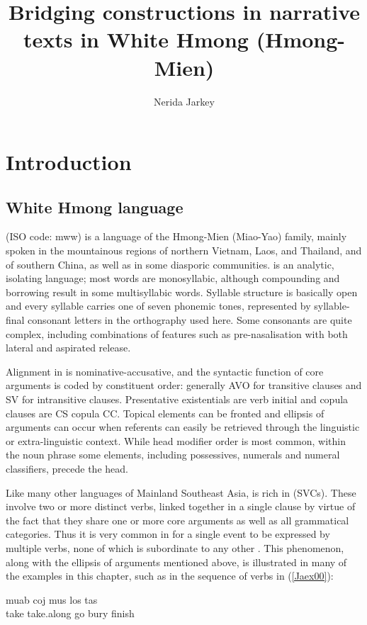 \documentclass[output=paper]{LSP/langsci}
\author{
   Nerida Jarkey\affiliation{School of {L}anguages and {C}ultures, University of Sydney}
}
\title{Bridging constructions in narrative texts in White Hmong (Hmong-Mien)}
\begin{document}
\section{Introduction} 
\label{Jasec:Introduction}

\subsection{White Hmong language}
 (ISO code: mww) is a language of the Hmong-Mien (Miao-Yao) family, mainly spoken in the mountainous regions of northern Vietnam, Laos, and Thailand, and of southern China, as well as in some diasporic communities.  is an analytic, isolating language; most words are monosyllabic, although compounding and borrowing result in some multisyllabic words. Syllable structure is basically open and every syllable carries one of seven phonemic tones, represented by syllable-final consonant letters in the orthography used here. Some consonants are quite complex, including combinations of features such as pre-nasalisation with both lateral and aspirated release.

Alignment in  is nominative-accusative, and the syntactic function of core arguments is coded by constituent order: generally AVO for transitive clauses and SV for intransitive clauses. Presentative existentials are verb initial and copula clauses are CS copula CC. Topical elements can be fronted and ellipsis of arguments can occur when referents can easily be retrieved through the linguistic or extra-linguistic context. While head modifier order is most common, within the noun phrase some elements, including possessives, numerals and numeral classifiers, precede the head.

Like many other languages of Mainland Southeast Asia,  is rich in  (SVCs). These involve two or more distinct verbs, linked together in a single clause by virtue of the fact that they share one or more core arguments as well as all grammatical categories. Thus it is very common in  for a single event to be expressed by multiple verbs, none of which is subordinate to any other \citep[][76--110]{jarkey15}. This phenomenon, along with the ellipsis of arguments mentioned above, is illustrated in many of the examples in this chapter, such as in the sequence of verbs in (\ref{Jaex00}): 


\begin{exe}
\ex \label{Jaex00}
\gll muab coj mus los tas\\
take take.along go bury finish\\
\glt {}\\
\end{exe}
\end{document}
